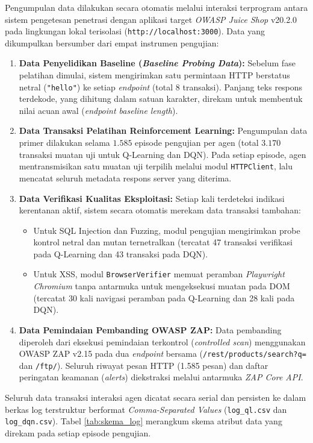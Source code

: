 Pengumpulan data dilakukan secara otomatis melalui interaksi terprogram antara sistem pengetesan penetrasi dengan aplikasi target \textit{OWASP Juice Shop} v20.2.0 pada lingkungan lokal terisolasi (\texttt{http://localhost:3000}). Data yang dikumpulkan bersumber dari empat instrumen pengujian:
\begin{enumerate}
    \item \textbf{Data Penyelidikan Baseline (\textit{Baseline Probing Data}):} Sebelum fase pelatihan dimulai, sistem mengirimkan satu permintaan HTTP berstatus netral (\texttt{"hello"}) ke setiap \textit{endpoint} (total 8 transaksi). Panjang teks respons terdekode, yang dihitung dalam satuan karakter, direkam untuk membentuk nilai acuan awal (\textit{endpoint baseline length}).
    \item \textbf{Data Transaksi Pelatihan Reinforcement Learning:} Pengumpulan data primer dilakukan selama $1.585$ episode pengujian per agen (total $3.170$ transaksi muatan uji untuk Q-Learning dan DQN). Pada setiap episode, agen mentransmisikan satu muatan uji terpilih melalui modul \texttt{HTTPClient}, lalu mencatat seluruh metadata respons server yang diterima.
    \item \textbf{Data Verifikasi Kualitas Eksploitasi:} Setiap kali terdeteksi indikasi kerentanan aktif, sistem secara otomatis merekam data transaksi tambahan:
    \begin{itemize}
        \item Untuk SQL Injection dan Fuzzing, modul pengujian mengirimkan probe kontrol netral dan mutan ternetralkan (tercatat 47 transaksi verifikasi pada Q-Learning dan 43 transaksi pada DQN). 
        \item Untuk XSS, modul \texttt{BrowserVerifier} memuat peramban \textit{Playwright Chromium} tanpa antarmuka untuk mengeksekusi muatan pada DOM (tercatat 30 kali navigasi peramban pada Q-Learning dan 28 kali pada DQN). 
    \end{itemize}
    \item \textbf{Data Pemindaian Pembanding OWASP ZAP:} Data pembanding diperoleh dari eksekusi pemindaian terkontrol (\textit{controlled scan}) menggunakan OWASP ZAP v2.15 pada dua \textit{endpoint} bersama (\texttt{/rest/products/search?q=} dan \texttt{/ftp/}). Seluruh riwayat pesan HTTP (1.585 pesan) dan daftar peringatan keamanan (\textit{alerts}) diekstraksi melalui antarmuka \textit{ZAP Core API}.
\end{enumerate}

Seluruh data transaksi interaksi agen dicatat secara serial dan persisten ke dalam berkas log terstruktur berformat \textit{Comma-Separated Values} (\texttt{log\_ql.csv} dan \texttt{log\_dqn.csv}). Tabel \ref{tab:skema_log} merangkum skema atribut data yang direkam pada setiap episode pengujian.


